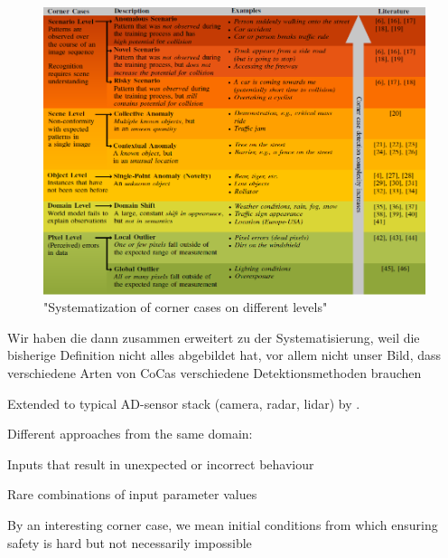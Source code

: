 \begin{figure}[hbtp]
\centering
\includegraphics[scale=1]{04_images/sota/corner_cases_systematization.png}
\caption{"Systematization of corner cases on different levels"\cite{breitenstein_systematization_2020}}
\label{fig:systematization_corner_case}
\end{figure}

\begin{displayquote}
Wir haben die dann zusammen erweitert zu der Systematisierung, weil die bisherige Definition nicht alles abgebildet hat, vor allem nicht unser Bild, dass verschiedene Arten von CoCas verschiedene Detektionsmethoden brauchen
\end{displayquote}

Extended to typical AD-sensor stack (camera, radar, lidar) by \cite{heidecker_application-driven_2021}.

Different approaches from the same domain:

\begin{displayquote}
Inputs that result in unexpected or incorrect behaviour \end{displayquote}

\begin{displayquote}
Rare combinations of input parameter values \end{displayquote}

\begin{displayquote}
By an interesting corner case, we mean
initial conditions from which ensuring safety is hard but not
necessarily impossible 
\end{displayquote}

